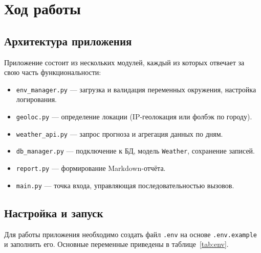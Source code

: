 \documentclass[11pt,a4paper]{article}
\begin{document}
\section*{\normalsize Ход работы}

\subsection*{Архитектура приложения}

Приложение состоит из нескольких модулей, каждый из которых отвечает за свою часть функциональности:
\begin{itemize}
    \item \texttt{env\_manager.py} --- загрузка и валидация переменных окружения, настройка логирования.
    \item \texttt{geoloc.py} --- определение локации (IP-геолокация или фолбэк по городу).
    \item \texttt{weather\_api.py} --- запрос прогноза и агрегация данных по дням.
    \item \texttt{db\_manager.py} --- подключение к БД, модель \texttt{Weather}, сохранение записей.
    \item \texttt{report.py} --- формирование Markdown-отчёта.
    \item \texttt{main.py} --- точка входа, управляющая последовательностью вызовов.
\end{itemize}

\newpage
\subsection*{Настройка и запуск}

Для работы приложения необходимо создать файл \texttt{.env} на основе \texttt{.env.example} и заполнить его. Основные переменные приведены в таблице~\ref{tab:env}.
\end{document}

